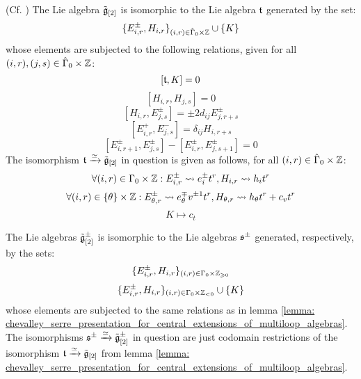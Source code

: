         \begin{lemma} \label{lemma: chevalley_serre_presentation_for_central_extensions_of_multiloop_algebras}
            (Cf. \cite[Proposition 6.6]{wendlandt_formal_shift_operators_on_yangian_doubles}) The Lie algebra $\tilde{\mathfrak{g}}_{[2]}$ is isomorphic to the Lie algebra $\mathfrak{t}$ generated by the set:
                $$\{ E_{i, r}^{\pm}, H_{i, r} \}_{(i, r) \in \hat{\Gamma}_0 \x \Z} \cup \{ K \}$$
            whose elements are subjected to the following relations, given for all $(i, r), (j, s) \in \hat{\Gamma}_0 \x \Z$:
                $$[\mathfrak{t}, K] = 0$$
                $$[ H_{i, r}, H_{j, s} ] = 0$$
                $$[ H_{i, r}, E_{j, s}^{\pm} ] = \pm 2 d_{ij} E_{j, r + s}^{\pm}$$
                $$[ E_{i, r}^+, E_{j, s}^- ] = \delta_{ij} H_{i, r + s}$$
                $$[ E_{i, r + 1}^{\pm}, E_{j, s}^{\pm} ] - [ E_{i, r}^{\pm}, E_{j, s + 1}^{\pm} ] = 0$$
            The isomorphism $\mathfrak{t} \xrightarrow[]{\simeq} \tilde{\mathfrak{g}}_{[2]}$ in question is given as follows, for all $(i, r) \in \hat{\Gamma}_0 \x \Z$:
                $$\forall (i, r) \in \Gamma_0 \x \Z: E_{i, r}^{\pm} \mapsto e_i^{\pm} t^r, H_{i, r} \mapsto h_i t^r$$
                $$\forall (i, r) \in \{\theta\} \x \Z: E_{\theta, r}^{\pm} \mapsto e_{\theta}^{\mp} v^{\pm 1} t^r, H_{\theta, r} \mapsto h_{\theta} t^r + c_v t^r$$
                $$K \mapsto c_t$$
        \end{lemma}
        \begin{corollary} \label{coro: chevalley_serre_presentation_for_central_extensions_of_multiloop_algebras}
            The Lie algebras $\tilde{\mathfrak{g}}_{[2]}^{\pm}$ is isomorphic to the Lie algebras $\mathfrak{s}^{\pm}$ generated, respectively, by the sets:
                $$\{ E_{i, r}^{\pm}, H_{i, r} \}_{(i, r) \in \Gamma_0 \x \Z_{\geq 0}}$$
                $$\{ E_{i, r}^{\pm}, H_{i, r} \}_{(i, r) \in \Gamma_0 \x \Z_{< 0}} \cup \{K\}$$
            whose elements are subjected to the same relations as in lemma \ref{lemma: chevalley_serre_presentation_for_central_extensions_of_multiloop_algebras}. The isomorphisms $\mathfrak{s}^{\pm} \xrightarrow[]{\simeq} \tilde{\mathfrak{g}}_{[2]}^{\pm}$ in question are just codomain restrictions of the isomorphism $\mathfrak{t} \xrightarrow[]{\simeq} \tilde{\mathfrak{g}}_{[2]}$ from lemma \ref{lemma: chevalley_serre_presentation_for_central_extensions_of_multiloop_algebras}.
        \end{corollary}

